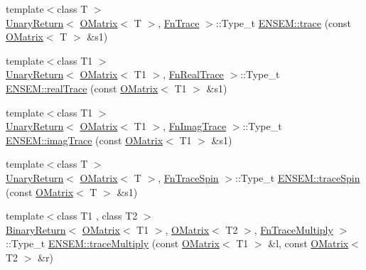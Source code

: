 \begin{DoxyCompactItemize}
\item 
{\footnotesize template$<$class T $>$ }\\\mbox{\hyperlink{structENSEM_1_1UnaryReturn}{Unary\+Return}}$<$ \mbox{\hyperlink{classENSEM_1_1OMatrix}{O\+Matrix}}$<$ T $>$, \mbox{\hyperlink{structENSEM_1_1FnTrace}{Fn\+Trace}} $>$\+::Type\+\_\+t \mbox{\hyperlink{group__obsmatrix_gaff7b73c5978746f6706e0cd02f55cc40}{E\+N\+S\+E\+M\+::trace}} (const \mbox{\hyperlink{classENSEM_1_1OMatrix}{O\+Matrix}}$<$ T $>$ \&s1)
\item 
{\footnotesize template$<$class T1 $>$ }\\\mbox{\hyperlink{structENSEM_1_1UnaryReturn}{Unary\+Return}}$<$ \mbox{\hyperlink{classENSEM_1_1OMatrix}{O\+Matrix}}$<$ T1 $>$, \mbox{\hyperlink{structENSEM_1_1FnRealTrace}{Fn\+Real\+Trace}} $>$\+::Type\+\_\+t \mbox{\hyperlink{group__obsmatrix_gab3988428b88d3b56d2f959c536ec7d2a}{E\+N\+S\+E\+M\+::real\+Trace}} (const \mbox{\hyperlink{classENSEM_1_1OMatrix}{O\+Matrix}}$<$ T1 $>$ \&s1)
\item 
{\footnotesize template$<$class T1 $>$ }\\\mbox{\hyperlink{structENSEM_1_1UnaryReturn}{Unary\+Return}}$<$ \mbox{\hyperlink{classENSEM_1_1OMatrix}{O\+Matrix}}$<$ T1 $>$, \mbox{\hyperlink{structENSEM_1_1FnImagTrace}{Fn\+Imag\+Trace}} $>$\+::Type\+\_\+t \mbox{\hyperlink{group__obsmatrix_ga3c2758e95f41075ca3a027c6651a66aa}{E\+N\+S\+E\+M\+::imag\+Trace}} (const \mbox{\hyperlink{classENSEM_1_1OMatrix}{O\+Matrix}}$<$ T1 $>$ \&s1)
\item 
{\footnotesize template$<$class T $>$ }\\\mbox{\hyperlink{structENSEM_1_1UnaryReturn}{Unary\+Return}}$<$ \mbox{\hyperlink{classENSEM_1_1OMatrix}{O\+Matrix}}$<$ T $>$, \mbox{\hyperlink{structENSEM_1_1FnTraceSpin}{Fn\+Trace\+Spin}} $>$\+::Type\+\_\+t \mbox{\hyperlink{group__obsmatrix_gae311225b718ade4433fe82a01a290d63}{E\+N\+S\+E\+M\+::trace\+Spin}} (const \mbox{\hyperlink{classENSEM_1_1OMatrix}{O\+Matrix}}$<$ T $>$ \&s1)
\item 
{\footnotesize template$<$class T1 , class T2 $>$ }\\\mbox{\hyperlink{structENSEM_1_1BinaryReturn}{Binary\+Return}}$<$ \mbox{\hyperlink{classENSEM_1_1OMatrix}{O\+Matrix}}$<$ T1 $>$, \mbox{\hyperlink{classENSEM_1_1OMatrix}{O\+Matrix}}$<$ T2 $>$, \mbox{\hyperlink{structENSEM_1_1FnTraceMultiply}{Fn\+Trace\+Multiply}} $>$\+::Type\+\_\+t \mbox{\hyperlink{group__obsmatrix_ga60f2f16fd8f3e889214584d3c0a90e92}{E\+N\+S\+E\+M\+::trace\+Multiply}} (const \mbox{\hyperlink{classENSEM_1_1OMatrix}{O\+Matrix}}$<$ T1 $>$ \&l, const \mbox{\hyperlink{classENSEM_1_1OMatrix}{O\+Matrix}}$<$ T2 $>$ \&r)

\end{DoxyCompactItemize}
